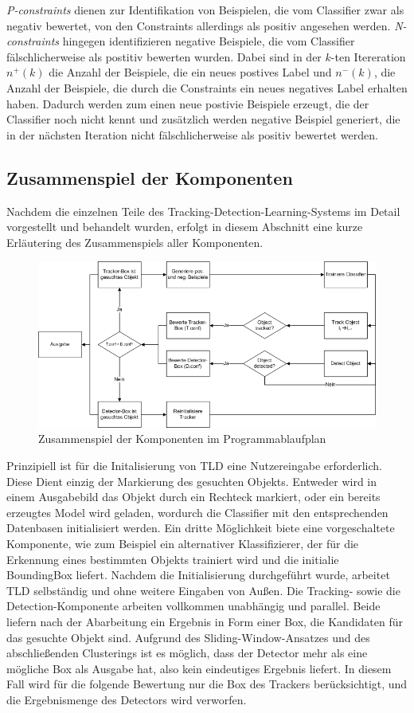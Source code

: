 \textit{P-constraints} dienen zur Identifikation von Beispielen, die vom Classifier zwar als negativ bewertet, von den Constraints allerdings als positiv angesehen werden. \textit{N-constraints} hingegen identifizieren negative Beispiele, die vom Classifier fälschlicherweise als postitiv bewerten wurden. Dabei sind in der $k$-ten Itereration $n^{+}(k)$ die Anzahl der Beispiele, die ein neues postives Label und $n^{-}(k)$, die Anzahl der Beispiele, die durch die Constraints ein neues negatives Label erhalten haben. Dadurch werden zum einen neue postivie Beispiele erzeugt, die der Classifier noch nicht kennt und zusätzlich werden negative Beispiel generiert, die in der nächsten Iteration nicht fälschlicherweise als positiv bewertet werden. 

\subsection{Zusammenspiel der Komponenten}
Nachdem die einzelnen Teile des Tracking-Detection-Learning-Systems im Detail vorgestellt und behandelt wurden, erfolgt in diesem Abschnitt eine kurze Erläutering des Zusammenspiels aller Komponenten.

\begin{figure}
\includegraphics[scale=0.5]{../pictures/PAP.png}

\caption{Zusammenspiel der Komponenten im Programmablaufplan}
\end{figure}
Prinzipiell ist für die Initalisierung von TLD eine Nutzereingabe erforderlich. Diese Dient einzig der Markierung des gesuchten Objekts. Entweder wird in einem Ausgabebild das Objekt durch ein Rechteck markiert, oder ein bereits erzeugtes Model wird geladen, wordurch die Classifier mit den entsprechenden Datenbasen initialisiert werden. Ein dritte Möglichkeit biete eine vorgeschaltete Komponente, wie zum Beispiel ein alternativer Klassifizierer, der für die Erkennung eines bestimmten Objekts trainiert wird und die initialie BoundingBox liefert. Nachdem die Initialisierung durchgeführt wurde, arbeitet TLD selbständig und ohne weitere Eingaben von Außen. Die Tracking- sowie die Detection-Komponente arbeiten vollkommen unabhängig und parallel. Beide liefern nach der Abarbeitung ein Ergebnis in Form einer Box, die Kandidaten für das gesuchte Objekt sind. Aufgrund des Sliding-Window-Ansatzes und des abschließenden Clusterings ist es möglich, dass der Detector mehr als eine mögliche Box als Ausgabe hat, also kein eindeutiges Ergebnis liefert. In diesem Fall wird für die folgende Bewertung nur die Box des Trackers berücksichtigt, und die Ergebnismenge des Detectors wird verworfen.

